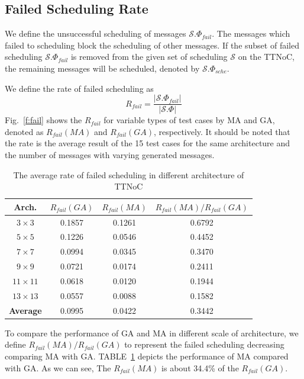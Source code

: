 \documentclass[10pt,journal]{IEEEtran}
\newcommand{\calS}{\mathcal{S}}
\theoremstyle{remark}
\begin{document}
\subsection{Failed Scheduling Rate}
We define the unsuccessful scheduling of messages $\calS.\Phi_{fail}$.
The messages which failed to scheduling block the scheduling of other messages.
If the subset of failed scheduling $\calS.\Phi_{fail}$ is removed from the given set of scheduling $\calS$ on the TTNoC,
 the remaining messages will be scheduled, denoted by $\calS.\Phi_{sche}$.

We define the rate of failed scheduling as
\begin{equation*}
	R_{fail} = \frac{|\calS.\Phi_{fail}|}{|\calS.\Phi|}
\end{equation*}
Fig.~\ref{f:fail} shows the $R_{fail}$ for variable types of test cases by MA and GA, denoted as $R_{fail}({MA})$ and $R_{fail}(GA)$, respectively. 
It should be noted that the rate is the average result of the 15 test cases for the same architecture and the number of messages with varying generated messages.
\begin{table}[!t]
	\renewcommand{\arraystretch}{1.3}
	\caption{The average rate of failed scheduling in different architecture of TTNoC}
	\label{t:performance}
	\centering
	\begin{tabular}{|c||c||c||c|}
		\hline
		\textbf{Arch.} & \textbf{$R_{fail}(GA)$} &\textbf{$R_{fail}(MA)$} & 
		\textbf{$R_{fail}(MA)/R_{fail}(GA)$}
		\\
		\hline 
		$3\times 3$&0.1857 &	0.1261 &	0.6792 
		\\
		\hline
		$5\times 5$&0.1226 &	0.0546 &	0.4452 
		\\
		\hline
		$7\times 7$&0.0994 &	0.0345 &	0.3470 
		\\
		\hline	
		$9\times 9$&0.0721 &	0.0174 &	0.2411 
		\\
		\hline
		$11\times 11$&0.0618 &	0.0120 &	0.1944 
		\\
		\hline
		$13\times 13$&0.0557& 	0.0088& 	0.1582 
		\\	
		\hline
		\textbf{Average}&0.0995 &0.0422 &0.3442 
		\\
		\hline
	\end{tabular}	
\end{table}
To compare the performance of GA and MA in different scale of architecture,
we define $R_{fail}(MA)/R_{fail}(GA)$ to represent the failed scheduling decreasing comparing MA with GA.
TABLE~\ref{t:performance} depicts the performance of MA compared with GA.
As we can see, The $R_{fail}(MA)$ is about 34.4\% of the $R_{fail}(GA)$.
\end{document}
